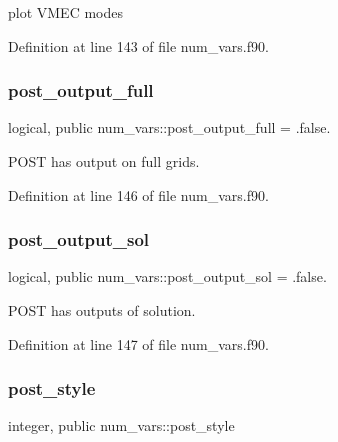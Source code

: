 plot V\+M\+EC modes 



Definition at line 143 of file num\+\_\+vars.\+f90.

\mbox{\label{namespacenum__vars_a7d65e7e9a9c8d9882929fc014b81a81b}} 
\subsubsection{\texorpdfstring{post\+\_\+output\+\_\+full}{post\_output\_full}}
{\footnotesize\ttfamily logical, public num\+\_\+vars\+::post\+\_\+output\+\_\+full = .false.}



P\+O\+ST has output on full grids. 



Definition at line 146 of file num\+\_\+vars.\+f90.

\mbox{\label{namespacenum__vars_a500deb6ae4c6ba1171c44513e1aac62b}} 
\subsubsection{\texorpdfstring{post\+\_\+output\+\_\+sol}{post\_output\_sol}}
{\footnotesize\ttfamily logical, public num\+\_\+vars\+::post\+\_\+output\+\_\+sol = .false.}



P\+O\+ST has outputs of solution. 



Definition at line 147 of file num\+\_\+vars.\+f90.

\mbox{\label{namespacenum__vars_a08dbb9f56d96f37c61cacb9d23d6e17f}} 
\subsubsection{\texorpdfstring{post\+\_\+style}{post\_style}}
{\footnotesize\ttfamily integer, public num\+\_\+vars\+::post\+\_\+style}



